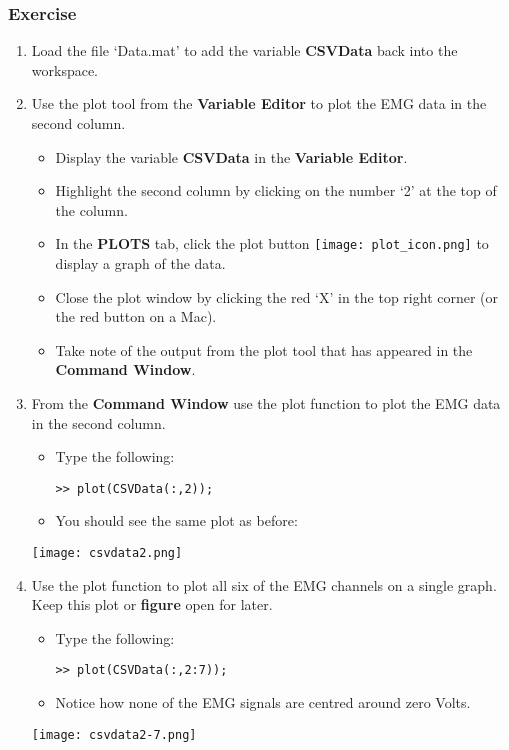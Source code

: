 \documentclass[12pt,a4paper]{article}
\begin{document}
\subsubsection*{Exercise}
\begin{enumerate}
	\item Load the file `Data.mat' to add the variable \textbf{CSVData} back into the workspace.
	\item Use the plot tool from the \textbf{Variable Editor} to plot the EMG data in the second column.
    	\begin{itemize}
    		\item Display the variable \textbf{CSVData} in the \textbf{Variable Editor}.
    		\item Highlight the second column by clicking on the number `2' at the top of the column.
    		\item In the \textbf{PLOTS} tab, click the plot button \texttt{[image: plot\_icon.png]} to display a graph of the data.
    		\item Close the plot window by clicking the red `X' in the top right corner (or the red button on a Mac).
    		\item Take note of the output from the plot tool that has appeared in the \textbf{Command Window}.		
    	\end{itemize}
	\item From the \textbf{Command Window} use the plot function to plot the EMG data in the second column.
	\begin{itemize}
		\item Type the following:
		\begin{lstlisting}[style=Matlab-editor]
>> plot(CSVData(:,2));
		\end{lstlisting}
		\item You should see the same plot as before:
	\end{itemize}
	\begin{center}
		\texttt{[image: csvdata2.png]}
	\end{center}
	\item Use the plot function to plot all six of the EMG channels on a single graph.  Keep this plot or \textbf{figure} open for later.
	\begin{itemize}
		\item Type the following:
		\begin{lstlisting}[style=Matlab-editor]
>> plot(CSVData(:,2:7));
		\end{lstlisting}		
		\item Notice how none of the EMG signals are centred around zero Volts.
	\end{itemize}
	\begin{center}
		\texttt{[image: csvdata2-7.png]}
	\end{center}
\end{enumerate}
\end{document}

